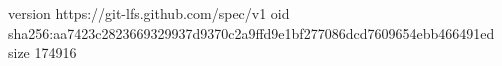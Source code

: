 version https://git-lfs.github.com/spec/v1
oid sha256:aa7423c2823669329937d9370c2a9ffd9e1bf277086dcd7609654ebb466491ed
size 174916

